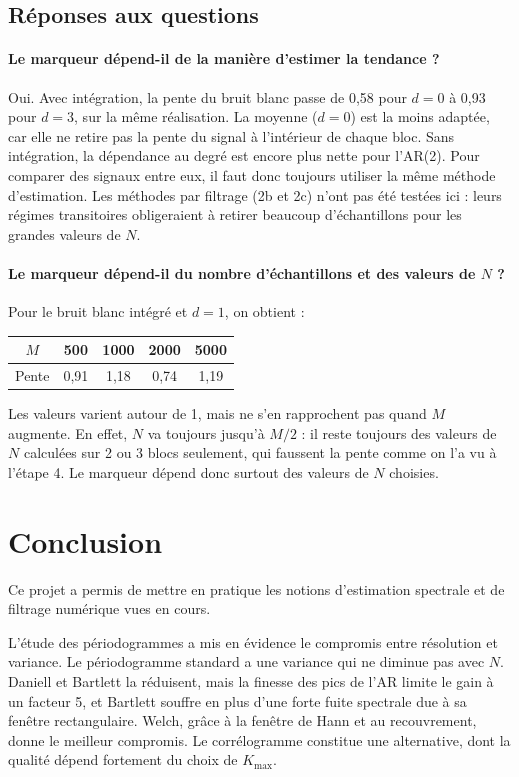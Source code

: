 \documentclass[11pt,a4paper]{article}
\begin{document}
\subsection{Réponses aux questions}

\paragraph{Le marqueur dépend-il de la manière d'estimer la tendance ?} Oui. Avec
intégration, la pente du bruit blanc passe de 0,58 pour $d = 0$ à 0,93 pour $d = 3$, sur la
même réalisation. La moyenne ($d = 0$) est la moins adaptée, car elle ne retire pas la
pente du signal à l'intérieur de chaque bloc. Sans intégration, la
dépendance au degré est encore plus nette pour l'AR(2). Pour comparer des signaux entre
eux, il faut donc toujours utiliser la même méthode d'estimation. Les méthodes par filtrage
(2b et 2c) n'ont pas été testées ici : leurs régimes transitoires obligeraient à retirer
beaucoup d'échantillons pour les grandes valeurs de $N$.

\paragraph{Le marqueur dépend-il du nombre d'échantillons et des valeurs de $N$ ?} Pour le
bruit blanc intégré et $d = 1$, on obtient :
\begin{center}
  \begin{tabular}{|c|c|c|c|c|}
    \hline
    $M$ & 500 & 1000 & 2000 & 5000 \\
    \hline
    Pente & 0,91 & 1,18 & 0,74 & 1,19 \\
    \hline
  \end{tabular}
\end{center}
Les valeurs varient autour de 1, mais ne s'en rapprochent pas quand $M$ augmente. En
effet, $N$ va toujours jusqu'à $M/2$ : il reste toujours des valeurs de $N$ calculées sur
2 ou 3 blocs seulement, qui faussent la pente comme on l'a vu à l'étape 4. Le marqueur
dépend donc surtout des valeurs de $N$ choisies.

\section{Conclusion}

Ce projet a permis de mettre en pratique les notions d'estimation spectrale et de filtrage numérique vues en cours.

L'étude des périodogrammes a mis en évidence le compromis entre résolution et variance. Le périodogramme standard a une variance qui ne diminue pas avec $N$. Daniell et Bartlett la réduisent, mais la finesse des pics de l'AR limite le gain à un facteur 5, et Bartlett souffre en plus d'une forte fuite spectrale due à sa fenêtre rectangulaire. Welch, grâce à la fenêtre de Hann et au recouvrement, donne le meilleur compromis. Le corrélogramme constitue une alternative, dont la qualité dépend fortement du choix de $K_{\max}$.
\end{document}
